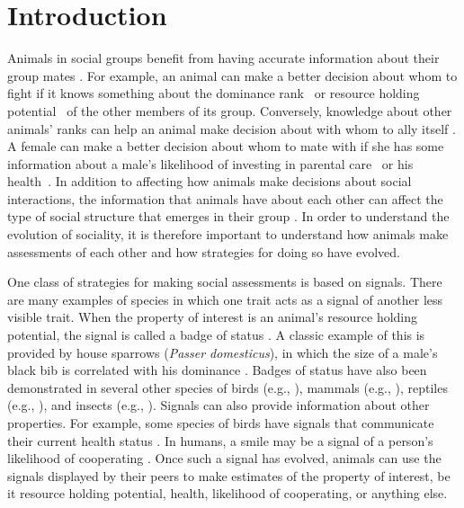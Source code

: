 \section*{Introduction} 
Animals in social groups benefit from having accurate information about their group mates \citep{Seyfarth:2010bh}. For example, an animal can make a better decision about whom to fight if it knows something about the dominance rank~\citep{Waal:1986ys,Cowlishaw:1990vn,Bergman:2003qf,Seyfarth:2005ve,Flack:2006uq,Hobson:2015uq} or resource holding potential~\citep{Rhijn:1980uq,Freeman:1985kl,Dick:1990cr,Lemel:1993ve,Part:1997ys} of the other members of its group. Conversely, knowledge about other animals' ranks can help an animal make decision about with whom to ally itself \citep{Engh:2005qp}. A female can  make a better decision about whom to mate with if she has some information about a male's likelihood of investing in parental care~\citep{Qvarnstrom:1997fk,McGlothlin:2007au,Olsen:2010uq} or his health~\citep{Folstad:1992kx,Loyau:2005nx}. In addition to affecting how animals make decisions about social interactions, the information that animals have about each other can affect the type of social structure that emerges in their group \citep{Dugatkin:2004hz,Hobson:2015uq,Brush:2018ss}. In order to understand the evolution of sociality, it is therefore important to understand how animals make assessments of each other and how strategies for doing so have evolved.  

One class of strategies for making social assessments is based on signals. There are many examples of species in which one trait acts as a signal of another less visible trait. When the property of interest is an animal's resource holding potential, the signal is called a badge of status \citep{dawkins1978signals,Rohwer:1981vn,Rohwer:1982fk,Ripoll:2004vn,sheehan2016evotradeoff}. A classic example of this is provided by house sparrows (\emph{Passer domesticus}), in which the size of a male's black bib is correlated with his dominance \citep{Veiga:1993fk,Veiga:1995ys}. Badges of status have also been demonstrated in several other species of birds (e.g., \citep{Remy:2010fk,Olsen:2010uq,Lemel:1993ve,Tibbetts:2009kx}), mammals (e.g., \citep{Gerald:2001zm}), reptiles (e.g., \citep{Fox:1990hd}), and insects (e.g., \citep{Tibbetts:2004kx}). Signals can also provide information about other properties. For example, some species of birds have signals that communicate their current health status \citep{Folstad:1992kx,Loyau:2005nx}. In humans, a smile may be a signal of a person's likelihood of cooperating \citep{Schug:2010be}. Once such a signal has evolved, animals can use the signals displayed by their peers to make estimates of the property of interest, be it resource holding potential, health, likelihood of cooperating, or anything else.

